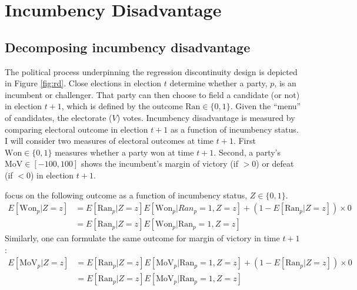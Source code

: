 \documentclass[11pt,english]{article}
\begin{document}
\section{Incumbency Disadvantage}

\subsection{Decomposing incumbency disadvantage}\label{app:decomposition}

The political process underpinning the regression discontinuity design is depicted in Figure \ref{fig:rd}. Close elections in election $t$ determine whether a party, $p$, is an incumbent or challenger. That party can then choose to field a candidate (or not) in election $t+1$, which is defined by the outcome $\text{Ran} \in \{0,1\}$. Given the ``menu'' of candidates, the electorate ($V$) votes. Incumbency disadvantage is measured by comparing electoral outcome in election $t+1$ as a function of incumbency status. I will consider two measures of electoral outcomes at time $t+1$. First $\text{Won} \in \{0,1\}$ measures whether a party won at time $t+1$. Second, a party's $\text{MoV} \in [-100, 100]$ shows the incumbent's margin of victory (if $>0$) or defeat (if $< 0$) in election $t+1$. 

\citet{klasnjatitiunik2017} focus on the following outcome as a function of incumbency status, $Z \in \{0, 1\}$.
\begin{align*}
E[\text{Won}_p|Z = z] &= E[\text{Ran}_p|Z = z]E[\text{Won}_p|Ran_p = 1, Z = z] + (1-E[\text{Ran}_p|Z = z]) \times 0 \\
&=E[\text{Ran}_p|Z = z]E[\text{Won}_p|\text{Ran}_p = 1, Z = z]
\end{align*}
Similarly, one can formulate the same outcome for margin of victory in time $t+1$:
\begin{align*}
E[\text{MoV}_p|Z = z] &= E[\text{Ran}_p|Z = z]E[\text{MoV}_p|\text{Ran}_p = 1, Z = z] + (1-E[\text{Ran}_p|Z = z]) \times 0 \\
&=E[\text{Ran}_p|Z = z]E[\text{MoV}_p|\text{Ran}_p = 1, Z = z]
\end{align*}
\end{document}
